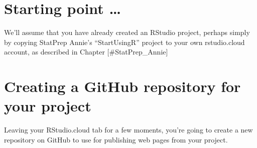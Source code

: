 \documentclass[]{book}
\theoremstyle{definition}
\theoremstyle{definition}
\theoremstyle{definition}
\theoremstyle{remark}
\begin{document}
\section{Starting point \ldots{}}\label{starting-point}

We'll assume that you have already created an RStudio project, perhaps
simply by copying StatPrep Annie's ``StartUsingR'' project to your own
rstudio.cloud account, as described in Chapter {[}\#StatPrep\_Annie{]}

\section{Creating a GitHub repository for your
project}\label{creating-a-github-repository-for-your-project}

Leaving your RStudio.cloud tab for a few moments, you're going to create
a new repository on GitHub to use for publishing web pages from your
project.
\end{document}
